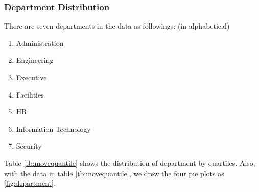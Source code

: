 \documentclass[aps, 10pt, a4paper]{article}
\begin{document}
            \subsubsection{Department Distribution}
                There are seven departments in the data as followings: (in alphabetical)
                \begin{enumerate}
                    \item Administration
                    \item Engineering
                    \item Executive
                    \item Facilities
                    \item HR
                    \item Information Technology
                    \item Security
                \end{enumerate}
            
                Table \ref{tb:movequantile} shows the distribution of department by quartiles. Also, with the data in table \ref{tb:movequantile}, we drew the four pie plots as \ref{fig:department}.
                
\end{document}
